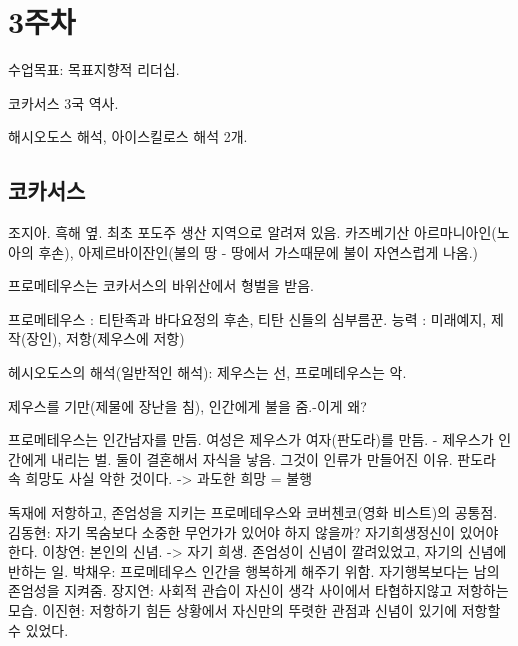 \section{3주차}

수업목표: 목표지향적 리더십.

코카서스 3국 역사.

해시오도스 해석, 아이스킬로스 해석 2개.

\subsection{코카서스}
조지아. 흑해 옆. 최초 포도주 생산 지역으로 알려져 있음. 카즈베기산
아르마니아인(노아의 후손), 아제르바이잔인(불의 땅 - 땅에서 가스때문에 불이 자연스럽게 나옴.)

프로메테우스는 코카서스의 바위산에서 형벌을 받음.

프로메테우스 : 티탄족과 바다요정의 후손, 티탄 신들의 심부름꾼.
능력 : 미래예지, 제작(장인), 저항(제우스에 저항)

헤시오도스의 해석(일반적인 해석): 제우스는 선, 프로메테우스는 악.

제우스를 기만(제물에 장난을 침), 인간에게 불을 줌.-이게 왜? 

프로메테우스는 인간남자를 만듬. 여성은 제우스가 여자(판도라)를 만듬. - 제우스가 인간에게 내리는 벌.
둘이 결혼해서 자식을 낳음. 그것이 인류가 만들어진 이유.
판도라 속 희망도 사실 악한 것이다. -> 과도한 희망 = 불행

독재에 저항하고, 존엄성을 지키는 프로메테우스와 코버첸코(영화 비스트)의 공통점.
김동현: 자기 목숨보다 소중한 무언가가 있어야 하지 않을까? 자기희생정신이 있어야 한다.
이창연: 본인의 신념. -> 자기 희생. 존엄성이 신념이 깔려있었고, 자기의 신념에 반하는 일.
박채우: 프로메테우스 인간을 행복하게 해주기 위함. 자기행복보다는 남의 존엄성을 지켜줌.
장지연: 사회적 관습이 자신이 생각 사이에서 타협하지않고 저항하는 모습.
이진현: 저항하기 힘든 상황에서 자신만의 뚜렷한 관점과 신념이 있기에 저항할 수 있었다.